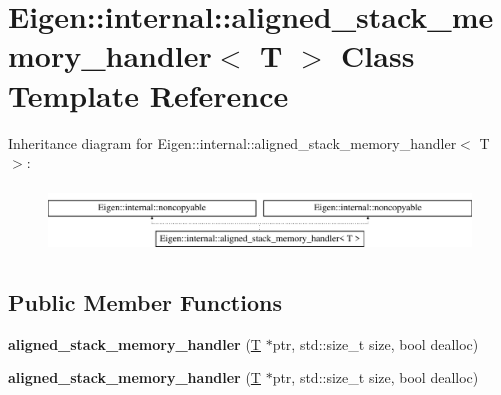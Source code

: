 \hypertarget{class_eigen_1_1internal_1_1aligned__stack__memory__handler}{}\section{Eigen\+:\+:internal\+:\+:aligned\+\_\+stack\+\_\+memory\+\_\+handler$<$ T $>$ Class Template Reference}
\label{class_eigen_1_1internal_1_1aligned__stack__memory__handler}
Inheritance diagram for Eigen\+:\+:internal\+:\+:aligned\+\_\+stack\+\_\+memory\+\_\+handler$<$ T $>$\+:\begin{figure}[H]
\begin{center}
\leavevmode
\includegraphics[height=1.777778cm]{class_eigen_1_1internal_1_1aligned__stack__memory__handler}
\end{center}
\end{figure}
\subsection*{Public Member Functions}
\begin{DoxyCompactItemize}
\item 
\mbox{\label{class_eigen_1_1internal_1_1aligned__stack__memory__handler_a6cb7f7415fdcaf5a53d214092e737200}} 
{\bfseries aligned\+\_\+stack\+\_\+memory\+\_\+handler} (\hyperlink{group___sparse_core___module}{T} $\ast$ptr, std\+::size\+\_\+t size, bool dealloc)
\item 
\mbox{\label{class_eigen_1_1internal_1_1aligned__stack__memory__handler_a6cb7f7415fdcaf5a53d214092e737200}} 
{\bfseries aligned\+\_\+stack\+\_\+memory\+\_\+handler} (\hyperlink{group___sparse_core___module}{T} $\ast$ptr, std\+::size\+\_\+t size, bool dealloc)
\end{DoxyCompactItemize}
